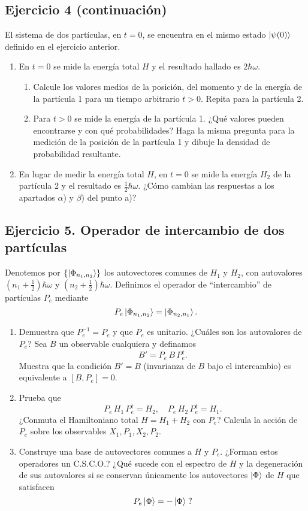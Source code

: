 \documentclass[a4paper,11pt]{article}
\begin{document}
\subsection*{Ejercicio 4 (continuación)}

El sistema de dos partículas, en \(t=0\), se encuentra en el mismo estado \(\ket{\psi(0)}\) definido en el ejercicio anterior.

\begin{enumerate}
  \item En \(t=0\) se mide la energía total \(H\) y el resultado hallado es \(2\hbar\omega\).  
  \begin{enumerate}
    \item Calcule los valores medios de la posición, del momento y de la energía de la partícula 1 para un tiempo arbitrario \(t>0\). Repita para la partícula 2.
    \item Para \(t>0\) se mide la energía de la partícula 1. ¿Qué valores pueden encontrarse y con qué probabilidades? Haga la misma pregunta para la medición de la posición de la partícula 1 y dibuje la densidad de probabilidad resultante.
  \end{enumerate}
  
  \item En lugar de medir la energía total \(H\), en \(t=0\) se mide la energía \(H_2\) de la partícula 2 y el resultado es \(\tfrac12\hbar\omega\). ¿Cómo cambian las respuestas a los apartados $\alpha$) y $\beta$) del punto a)?
\end{enumerate}

\subsection*{Ejercicio 5. Operador de intercambio de dos partículas}

Denotemos por \(\{\ket{\Phi_{n_1,n_2}}\}\) los autovectores comunes de \(H_1\) y \(H_2\), con autovalores \((n_1+\tfrac12)\hbar\omega\) y \((n_2+\tfrac12)\hbar\omega\). Definimos el operador de “intercambio” de partículas \(P_e\) mediante
\[
P_e \ket{\Phi_{n_1,n_2}} = \ket{\Phi_{n_2,n_1}}.
\]

\begin{enumerate}
\item Demuestra que \(P_e^{-1}=P_e\) y que \(P_e\) es unitario. ¿Cuáles son los autovalores de \(P_e\)? Sea \(B\) un observable cualquiera y definamos
\[
B' = P_e\,B\,P_e^\dagger.
\]
Muestra que la condición \(B'=B\) (invarianza de \(B\) bajo el intercambio) es equivalente a \([B,P_e]=0\).

\item Prueba que
\[
P_e \,H_1\,P_e^\dagger = H_2,
\quad
P_e \,H_2\,P_e^\dagger = H_1.
\]
¿Conmuta el Hamiltoniano total \(H=H_1+H_2\) con \(P_e\)? Calcula la acción de \(P_e\) sobre los observables \(X_1,P_1,X_2,P_2\).

\item Construye una base de autovectores comunes a \(H\) y \(P_e\). ¿Forman estos operadores un C.S.C.O.? ¿Qué sucede con el espectro de \(H\) y la degeneración de sus autovalores si se conservan únicamente los autovectores \(\ket{\Phi}\) de \(H\) que satisfacen 
\[
P_e\ket{\Phi}=-\ket{\Phi}\;?
\]
\end{enumerate}
\end{document}
